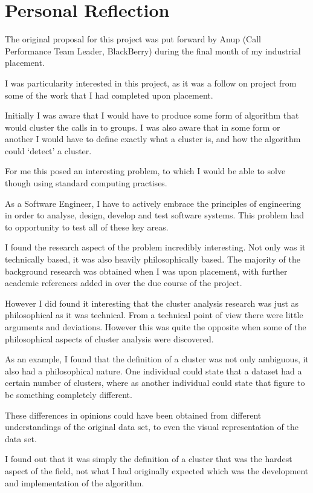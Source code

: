 \section{Personal Reflection}
\label{sec:personal_reflection}

The original proposal for this project was put forward by Anup (Call 
Performance Team Leader, BlackBerry) during the final month of my industrial 
placement. 

I was particularity interested in this project, as it was a follow on project 
from some of the work that I had completed upon placement.

Initially I was aware that I would have to produce some form of algorithm that
would cluster the calls in to groups. I was also aware that in some form or 
another I would have to define exactly what a cluster is, and how the algorithm 
could `detect' a cluster.

For me this posed an interesting problem, to which I would be able to solve 
though using standard computing practises. 

As a Software Engineer, I have to actively embrace the principles of 
engineering in order to analyse, design, develop and test software systems. 
This problem had to opportunity to test all of these key areas.

I found the research aspect of the problem incredibly interesting. Not only was
it technically based, it was also heavily philosophically based. The majority 
of the background research was obtained when I was upon placement, with further 
academic references added in over the due course of the project.

However I did found it interesting that the cluster analysis research was just 
as philosophical as it was technical. From a technical point of view there were
little arguments and deviations. However this was quite the opposite when some 
of the philosophical aspects of cluster analysis were discovered.

As an example, I found that the definition of a cluster was not only ambiguous,
it also had a philosophical nature. One individual could state that a dataset 
had a certain number of clusters, where as another individual could state that
figure to be something completely different.

These differences in opinions could have been obtained from different 
understandings of the original data set, to even the visual representation of 
the data set. 

I found out that it was simply the definition of a cluster that was the hardest
aspect of the field, not what I had originally expected which was the 
development and implementation of the algorithm.


